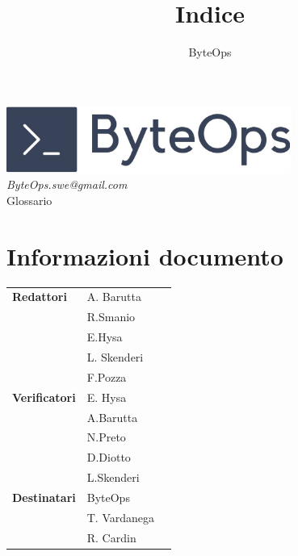 \documentclass{article}
\title{\textbf{\fontsize{28}{6}\selectfont Indice}}
\author{\fontsize{14}{6}\selectfont ByteOps}
\date{}
\begin{document}
\pagestyle{fancy}
\begin{center}
    \includegraphics[width = 0.7\textwidth]{../Images/logo.png} \\
    \vspace{0.2cm}
    \textcolor[RGB]{60, 60, 60}{\textit{ByteOps.swe@gmail.com}} \\
    \vspace{2cm}
    \fontsize{16}{6}\selectfont Glossario \\
    \vspace{0.5cm}
\end{center}

\section*{Informazioni documento}
\def\arraystretch{1.2}
\begin{tabular}{>{\raggedleft\arraybackslash}p{}|>{\raggedright\arraybackslash}p{}c}
    \hline
    \addlinespace 
    \textbf{Redattori}    & A. Barutta\\ & R.Smanio\\ & E.Hysa\\ & L. Skenderi\\ & F.Pozza \vspace{10pt} \\
    \textbf{Verificatori} & E. Hysa\\ & A.Barutta\\ & N.Preto\\ & D.Diotto\\ & L.Skenderi \vspace{10pt} \\
    \textbf{Destinatari}  & ByteOps\\ & T. Vardanega   \\ & R. Cardin \vspace{10pt} \\
\end{tabular}

\pagebreak 

\end{document}
